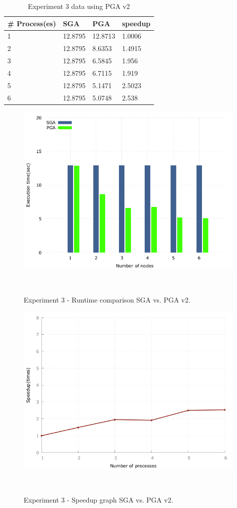 \begin{table}[H]
\centering
\caption{Experiment 3 data using PGA v2}
\label{tab:pga2_node}
\begin{tabular}{|l|l|l|l|}
\hline
\# Process(es) & SGA     & PGA     & speedup \\ \hline
1        & 12.8795 & 12.8713 & 1.0006  \\ \hline
2        & 12.8795 & 8.6353  & 1.4915  \\ \hline
3        & 12.8795 & 6.5845  & 1.956   \\ \hline
4        & 12.8795 & 6.7115  & 1.919   \\ \hline
5        & 12.8795 & 5.1471  & 2.5023  \\ \hline
6        & 12.8795 & 5.0748  & 2.538   \\ \hline
\end{tabular}
\end{table}

\begin{figure}[H]
\begin{center}
  \includegraphics[width=.7 \linewidth]{stats_data_new/graphs/pga_global_xNodes_hist.png}
  \caption{Experiment 3 - Runtime comparison SGA vs. PGA v2.}
  \end{center}\
\end{figure}

\begin{figure}[H]
\begin{center}
  \includegraphics[width=.7 \linewidth]{stats_data_new/graphs/pga_global_xNodes_line.png}
  \caption{Experiment 3 - Speedup graph SGA vs. PGA v2.}
  \end{center}\
\end{figure}

